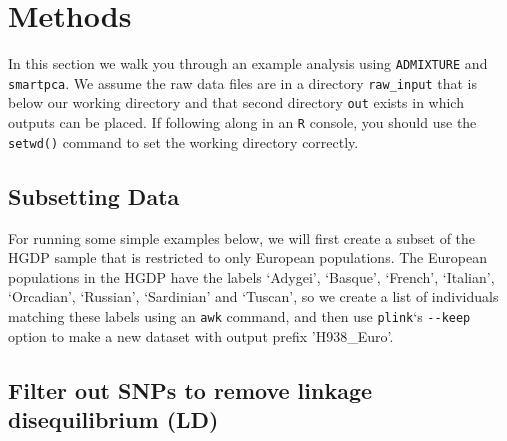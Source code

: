 \documentclass{svmult}       %
\newenvironment{Shaded}{\begin{snugshade}}{\end{snugshade}}
\newcommand{\DataTypeTok}[1]{\textcolor[rgb]{0.13,0.29,0.53}{#1}}
\newcommand{\StringTok}[1]{\textcolor[rgb]{0.31,0.60,0.02}{#1}}
\newcommand{\FunctionTok}[1]{\textcolor[rgb]{0.00,0.00,0.00}{#1}}
\newcommand{\OperatorTok}[1]{\textcolor[rgb]{0.81,0.36,0.00}{\textbf{#1}}}
\newcommand{\ExtensionTok}[1]{#1}
\newcommand{\NormalTok}[1]{#1}
\begin{document}
\section{Methods}\label{methods}

In this section we walk you through an example analysis using
\texttt{ADMIXTURE} and \texttt{smartpca}. We assume the raw data files
are in a directory \texttt{raw\_input} that is below our working
directory and that second directory \texttt{out} exists in which outputs
can be placed. If following along in an \texttt{R} console, you should
use the \texttt{setwd()} command to set the working directory correctly.

\subsection{Subsetting Data}\label{subsetting-data}

For running some simple examples below, we will first create a subset of
the HGDP sample that is restricted to only European populations. The
European populations in the HGDP have the labels `Adygei', `Basque',
`French', `Italian', `Orcadian', `Russian', `Sardinian' and `Tuscan', so
we create a list of individuals matching these labels using an
\texttt{awk} command, and then use \texttt{plink}`s \texttt{-\/-keep}
option to make a new dataset with output prefix 'H938\_Euro'.

\begin{Shaded}
\end{Shaded}

\subsection{Filter out SNPs to remove linkage disequilibrium
(LD)}\label{filter-out-snps-to-remove-linkage-disequilibrium-ld}
\end{document}
